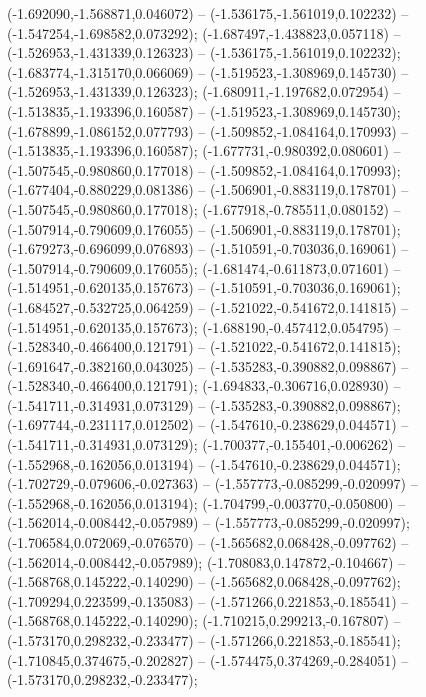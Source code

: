  (-1.692090,-1.568871,0.046072) -- (-1.536175,-1.561019,0.102232) -- (-1.547254,-1.698582,0.073292);
 (-1.687497,-1.438823,0.057118) -- (-1.526953,-1.431339,0.126323) -- (-1.536175,-1.561019,0.102232);
 (-1.683774,-1.315170,0.066069) -- (-1.519523,-1.308969,0.145730) -- (-1.526953,-1.431339,0.126323);
 (-1.680911,-1.197682,0.072954) -- (-1.513835,-1.193396,0.160587) -- (-1.519523,-1.308969,0.145730);
 (-1.678899,-1.086152,0.077793) -- (-1.509852,-1.084164,0.170993) -- (-1.513835,-1.193396,0.160587);
 (-1.677731,-0.980392,0.080601) -- (-1.507545,-0.980860,0.177018) -- (-1.509852,-1.084164,0.170993);
 (-1.677404,-0.880229,0.081386) -- (-1.506901,-0.883119,0.178701) -- (-1.507545,-0.980860,0.177018);
 (-1.677918,-0.785511,0.080152) -- (-1.507914,-0.790609,0.176055) -- (-1.506901,-0.883119,0.178701);
 (-1.679273,-0.696099,0.076893) -- (-1.510591,-0.703036,0.169061) -- (-1.507914,-0.790609,0.176055);
 (-1.681474,-0.611873,0.071601) -- (-1.514951,-0.620135,0.157673) -- (-1.510591,-0.703036,0.169061);
 (-1.684527,-0.532725,0.064259) -- (-1.521022,-0.541672,0.141815) -- (-1.514951,-0.620135,0.157673);
 (-1.688190,-0.457412,0.054795) -- (-1.528340,-0.466400,0.121791) -- (-1.521022,-0.541672,0.141815);
 (-1.691647,-0.382160,0.043025) -- (-1.535283,-0.390882,0.098867) -- (-1.528340,-0.466400,0.121791);
 (-1.694833,-0.306716,0.028930) -- (-1.541711,-0.314931,0.073129) -- (-1.535283,-0.390882,0.098867);
 (-1.697744,-0.231117,0.012502) -- (-1.547610,-0.238629,0.044571) -- (-1.541711,-0.314931,0.073129);
 (-1.700377,-0.155401,-0.006262) -- (-1.552968,-0.162056,0.013194) -- (-1.547610,-0.238629,0.044571);
 (-1.702729,-0.079606,-0.027363) -- (-1.557773,-0.085299,-0.020997) -- (-1.552968,-0.162056,0.013194);
 (-1.704799,-0.003770,-0.050800) -- (-1.562014,-0.008442,-0.057989) -- (-1.557773,-0.085299,-0.020997);
 (-1.706584,0.072069,-0.076570) -- (-1.565682,0.068428,-0.097762) -- (-1.562014,-0.008442,-0.057989);
 (-1.708083,0.147872,-0.104667) -- (-1.568768,0.145222,-0.140290) -- (-1.565682,0.068428,-0.097762);
 (-1.709294,0.223599,-0.135083) -- (-1.571266,0.221853,-0.185541) -- (-1.568768,0.145222,-0.140290);
 (-1.710215,0.299213,-0.167807) -- (-1.573170,0.298232,-0.233477) -- (-1.571266,0.221853,-0.185541);
 (-1.710845,0.374675,-0.202827) -- (-1.574475,0.374269,-0.284051) -- (-1.573170,0.298232,-0.233477);
